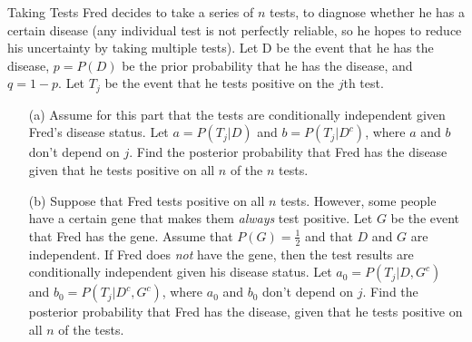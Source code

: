\documentclass[11pt]{article}
\begin{document}
\begin{exercise}{Taking Tests}
Fred decides to take a series of $n$ tests, to diagnose whether he has a certain disease (any individual test is not perfectly reliable, so he hopes to reduce his uncertainty by taking multiple tests). Let D be the event that he has the disease, $p = P(D)$ be the prior probability that he has the disease, and $q = 1-p$. Let $T_j$ be the event that he tests positive on the $j$th test. 

\begin{enumerate}
\item [(a)] Assume for this part that the tests are conditionally independent given Fred's disease status. Let $a = P(T_j | D)$ and $b = P(T_j | D^c)$, where $a$ and $b$ don't depend on $j$. Find the posterior probability that Fred has the disease given that he tests positive on all $n$ of the $n$ tests. 

\item [(b)] Suppose that Fred tests positive on all $n$ tests. However, some people have a certain gene that makes them \textit{always} test positive. Let $G$ be the event that Fred has the gene. Assume that $P(G) = \frac{1}{2}$ and that $D$ and $G$ are independent. If Fred does \textit{not} have the gene, then the test results are conditionally independent given his disease status. Let $a_0 = P(T_j | D, G^c)$ and $b_0 = P(T_j | D^c, G^c)$, where $a_0$ and $b_0$ don't depend on $j$. Find the posterior probability that Fred has the disease, given that he tests positive on all $n$ of the tests. 

\end{enumerate}
\end{exercise} 
\end{document}
